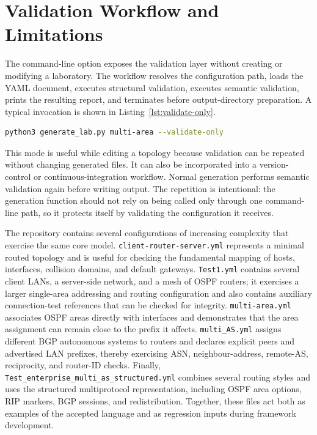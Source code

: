 \section{Validation Workflow and Limitations}
\label{sec:validation-workflow}

The command-line option  exposes the validation layer
without creating or modifying a laboratory. The workflow resolves the
configuration path, loads the YAML document, executes structural validation,
executes semantic validation, prints the resulting report, and terminates
before output-directory preparation. A typical invocation is shown in
Listing~\ref{lst:validate-only}.

\begin{lstlisting}[language=bash,caption={Validating a configuration without generating a laboratory.},label={lst:validate-only}]
python3 generate_lab.py multi-area --validate-only
\end{lstlisting}

This mode is useful while editing a topology because validation can be repeated
without changing generated files. It can also be incorporated into a
version-control or continuous-integration workflow. Normal generation performs
semantic validation again before writing output. The repetition is
intentional: the generation function should not rely on being called only
through one command-line path, so it protects itself by validating the
configuration it receives.

The repository contains several configurations of increasing complexity that
exercise the same core model. \texttt{client-router-server.yml} represents a
minimal routed topology and is useful for checking the fundamental mapping of
hosts, interfaces, collision domains, and default gateways. \texttt{Test1.yml}
contains several client LANs, a server-side network, and a mesh of OSPF routers;
it exercises a larger single-area addressing and routing configuration and
also contains auxiliary connection-test references that can be checked for
integrity. \texttt{multi-area.yml} associates OSPF areas directly with
interfaces and demonstrates that the area assignment can remain close to the
prefix it affects. \texttt{multi\_AS.yml} assigns different BGP autonomous
systems to routers and declares explicit peers and advertised LAN prefixes,
thereby exercising ASN, neighbour-address, remote-AS, reciprocity, and router-ID
checks. Finally, \texttt{Test\_enterprise\_multi\_as\_structured.yml} combines
several routing styles and uses the structured multiprotocol representation,
including OSPF area options, RIP markers, BGP sessions, and redistribution.
Together, these files act both as examples of the accepted language and as
regression inputs during framework development.

